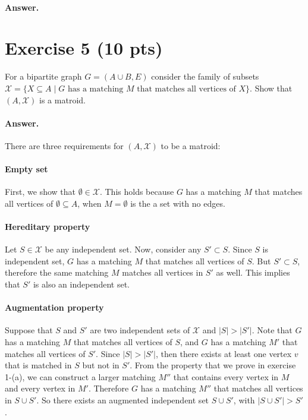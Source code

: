 \documentclass[a4paper]{article}
\begin{document}
\paragraph{Answer.}

\section*{Exercise 5 (10 pts)}

For a bipartite graph $G = (A \cup B, E)$ consider the family of subsets
$\mathcal{X} =\{X \subseteq A \; | \; \text{$G$ has a matching $M$}$ $\text{that matches all vertices of $X$}\}$. Show that $(A, \mathcal{X})$ is a matroid.

\paragraph{Answer.}

There are three requirements for $(A, \mathcal{X})$ to be a matroid:

\paragraph{Empty set} First, we show that $\emptyset \in \mathcal{X}$. This holds because $G$ has a matching $M$ that matches all vertices of $\emptyset \subseteq A$, when $M = \emptyset$ is the a set with no edges.

\paragraph{Hereditary property} Let $S \in \mathcal{X}$ be any independent set. Now, consider any $S' \subset S$.
Since $S$ is independent set, $G$ has a matching $M$ that matches all vertices of $S$.
But $S' \subset S$, therefore the same matching $M$ matches all vertices in $S'$ as well.
This implies that $S'$ is also an independent set.

\paragraph{Augmentation property} Suppose that $S$ and $S'$ are two independent sets of $\mathcal{X}$ and $|S| > |S'|$.
Note that $G$ has a matching $M$ that matches all vertices of $S$, and $G$ has a matching $M'$ that matches all vertices of $S'$. Since $|S| > |S'|$, then there exists at least one vertex $v$ that is matched in $S$ but not in $S'$.
From the property that we prove in exercise 1-(a), we can construct a larger matching $M''$ that contains every vertex in $M$ and every vertex in $M'$. Therefore $G$ has a matching $M''$ that matches all vertices in $S \cup S'$. So there exists an augmented independent set $S\cup S'$, with $|S\cup S'| > S'$.
\end{document}
